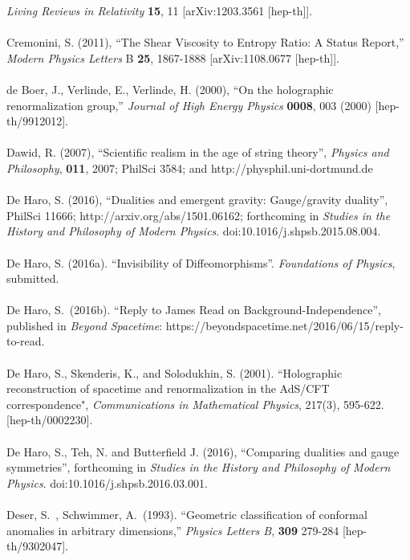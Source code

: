 \documentclass[12pt]{article}
\renewcommand{\^}[1]{\hat{#1}}
\begin{document}
  {\it Living Reviews in Relativity}  {\bf 15}, 11 
  [arXiv:1203.3561 [hep-th]].\\
\\
Cremonini, S. (2011), ``The Shear Viscosity to Entropy Ratio: A Status Report,''
  {\it Modern Physics Letters} B {\bf 25}, 1867-1888
  [arXiv:1108.0677 [hep-th]].\\
\\
de Boer, J., Verlinde, E., Verlinde, H. (2000), ``On the holographic renormalization group,''
  {\it Journal of High Energy Physics} {\bf 0008}, 003 (2000)
  [hep-th/9912012].\\
 \\
 Dawid, R. (2007), ``Scientific realism in the age of string theory'', {\it Physics and Philosophy}, {\bf 011}, 2007; PhilSci 3584; and http://physphil.uni-dortmund.de \\
 \\
De Haro, S. (2016), ``Dualities and emergent gravity: Gauge/gravity duality'', PhilSci 11666; http://arxiv.org/abs/1501.06162; forthcoming in {\em Studies in the History and Philosophy of Modern Physics}. doi:10.1016/j.shpsb.2015.08.004. \\
\\
De Haro, S. (2016a). ``Invisibility of Diffeomorphisms''. {\it Foundations of Physics}, submitted.\\
\\
De Haro, S.~(2016b). ``Reply to James Read on Background-Independence'', published in {\it Beyond Spacetime}: https://beyondspacetime.net/2016/06/15/reply-to-read.\\
\\
De Haro, S., Skenderis, K., and Solodukhin, S. (2001). ``Holographic reconstruction of spacetime and renormalization in the AdS/CFT correspondence", \emph{Communications in Mathematical Physics}, 217(3), 595-622. [hep-th/0002230].\\
\\
De Haro, S., Teh, N. and Butterfield J. (2016), ``Comparing dualities and gauge symmetries'', forthcoming in {\em Studies in the History and Philosophy of Modern Physics}. doi:10.1016/j.shpsb.2016.03.001.\\
\\
Deser, S.~, Schwimmer, A.~(1993).  ``Geometric classification of conformal anomalies in arbitrary dimensions,''
  {\it Physics Letters B}, {\bf 309}  279-284
  [hep-th/9302047].\\
\\
\end{document}
